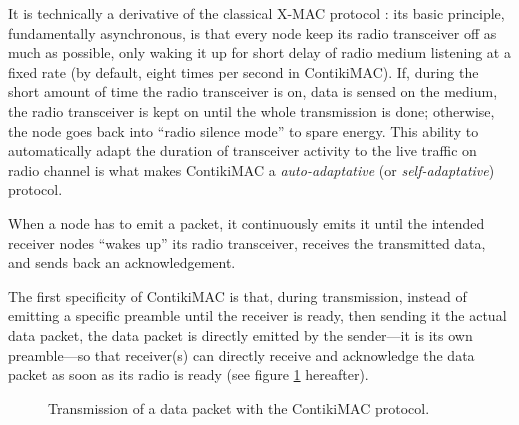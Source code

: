 \documentclass[a4paper,twoside]{article}
\begin{document}
It is technically a derivative of the classical X-MAC protocol \cite{XMAC}:
its basic principle, fundamentally asynchronous, is that every node keep
its radio transceiver off as much as possible, only waking it up for short
delay of radio medium listening at a fixed rate (by default, eight times
per second in ContikiMAC). If, during the short amount of time the radio
transceiver is on, data is sensed on the medium, the radio transceiver
is kept on until the whole transmission is done; otherwise, the node
goes back into ``radio silence mode'' to spare energy.
This ability to automatically adapt the duration of transceiver activity
to the live traffic on radio channel is what makes ContikiMAC a
\emph{auto-adaptative} (or \emph{self-adaptative}) protocol.

When a node has to emit a packet, it continuously emits it until the
intended receiver nodes ``wakes up'' its radio transceiver, receives
the transmitted data, and sends back an acknowledgement.

The first specificity of ContikiMAC is that, during transmission, instead
of emitting a specific preamble until the receiver is ready, then sending
it the actual data packet, the data packet is directly emitted by the
sender---it is its own preamble---so that receiver(s) can directly receive
and acknowledge the data packet as soon as its radio is ready (see figure
\ref{FigContikiMACDutyCycle} hereafter).

\begin{figure}[!h]
\centering
{}
\caption{Transmission of a data packet with the ContikiMAC protocol.}
\label{FigContikiMACDutyCycle}
\end{figure}
\end{document}
